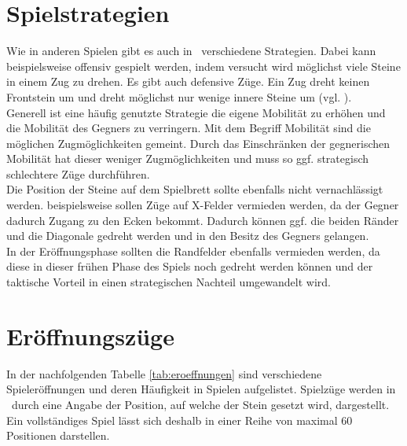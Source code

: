 \section{Spielstrategien}
\label{strat1}
Wie in anderen Spielen gibt es auch in \ot\ verschiedene Strategien. Dabei kann beispielsweise offensiv gespielt werden, indem versucht wird möglichst viele Steine in einem Zug zu drehen. Es gibt auch defensive  Züge. Ein  Zug dreht keinen Frontstein um und dreht möglichst nur wenige innere Steine um (vgl. \cite{Ortiz.}).
\\ Generell ist eine häufig genutzte Strategie die eigene Mobilität zu erhöhen und die Mobilität des Gegners zu verringern. Mit dem Begriff Mobilität sind die möglichen Zugmöglichkeiten gemeint. Durch das Einschränken der gegnerischen Mobilität hat dieser weniger Zugmöglichkeiten und muss so ggf. strategisch schlechtere Züge durchführen.
\\Die Position der Steine auf dem Spielbrett sollte ebenfalls nicht vernachlässigt werden.
beispielsweise sollen Züge auf X-Felder vermieden werden, da der Gegner dadurch Zugang zu den Ecken bekommt. Dadurch können ggf. die beiden Ränder und die Diagonale gedreht werden und in den Besitz des Gegners gelangen.
\\In der Eröffnungsphase sollten die Randfelder ebenfalls vermieden werden, da diese in dieser frühen Phase des Spiels noch gedreht werden können und der taktische Vorteil in einen strategischen Nachteil umgewandelt wird.
\section{Eröffnungszüge}
\label{othello-eroff}
In der nachfolgenden Tabelle \ref{tab:eroeffnungen} sind verschiedene Spieleröffnungen und deren Häufigkeit in Spielen aufgelistet. Spielzüge werden in \ot\ durch eine Angabe der Position, auf welche der Stein gesetzt wird, dargestellt. Ein vollständiges Spiel lässt sich deshalb in einer Reihe von maximal 60 Positionen darstellen.

